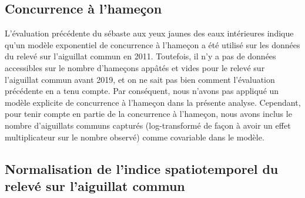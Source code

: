 \documentclass[11pt]{book}
\begin{document}
\hypertarget{sec:dog-hook-competition}{%
\subsection{Concurrence à l'hameçon}\label{sec:dog-hook-competition}}

L'évaluation précédente du sébaste aux yeux jaunes des eaux intérieures indique qu'un modèle exponentiel de concurrence à l'hameçon a été utilisé sur les données du relevé sur l'aiguillat commun en 2011. Toutefois, il n'y a pas de données accessibles sur le nombre d'hameçons appâtés et vides pour le relevé sur l'aiguillat commun avant 2019, et on ne sait pas bien comment l'évaluation précédente en a tenu compte. Par conséquent, nous n'avons pas appliqué un modèle explicite de concurrence à l'hameçon dans la présente analyse. Cependant, pour tenir compte en partie de la concurrence à l'hameçon, nous avons inclus le nombre d'aiguillats communs capturés (log-transformé de façon à avoir un effet multiplicateur sur le nombre observé) comme covariable dans le modèle.

\hypertarget{sec:dog-index-model}{%
\subsection{Normalisation de l'indice spatiotemporel du relevé sur l'aiguillat commun}\label{sec:dog-index-model}}
\end{document}
